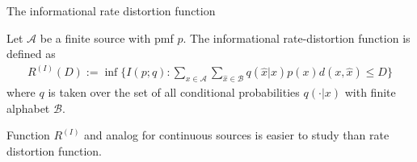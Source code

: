 \begin{frame}{The informational rate distortion function}
\begin{definition}
Let $\mathcal{A}$ be a finite source with pmf $p$. 
The informational rate-distortion function is defined as 
\begin{align}\label{DefInfRDRProb}
R^{(I)}(D):=\inf\{I(p;q)\colon \sum_{x\in\mathcal{A}}\sum_{\hat{x}\in\mathcal{B}}q(\hat{x}|x)p(x)d(x,\hat{x})\leq D\}
\end{align}
where $q$ is taken over the set of all conditional probabilities $q(\cdot|x)$ with finite alphabet $\mathcal{B}$.
\end{definition}

 Function $R^{(I)}$ and analog for continuous sources is easier to study than rate distortion function.

\end{frame}

